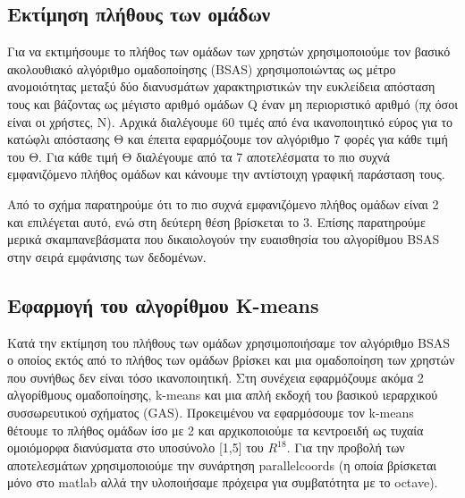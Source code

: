\subsection{Εκτίμηση πλήθους των ομάδων}
Για να εκτιμήσουμε το πλήθος των ομάδων των χρηστών χρησιμοποιούμε τον βασικό ακολουθιακό αλγόριθμο ομαδοποίησης (BSAS) χρησιμοποιώντας ως μέτρο ανομοιότητας μεταξύ δύο διανυσμάτων χαρακτηριστικών την ευκλείδεια απόσταση τους και βάζοντας ως μέγιστο αριθμό ομάδων Q έναν μη περιοριστικό αριθμό (πχ όσοι είναι οι χρήστες, Ν).
Αρχικά διαλέγουμε 60 τιμές από ένα ικανοποιητικό εύρος για το κατώφλι απόστασης Θ και έπειτα εφαρμόζουμε τον αλγόριθμο 7 φορές για κάθε τιμή του Θ.
Για κάθε τιμή Θ διαλέγουμε από τα 7 αποτελέσματα το πιο συχνά εμφανιζόμενο πλήθος ομάδων και κάνουμε την αντίστοιχη γραφική παράσταση τους.

\clearpage
\begin{figure}[ht]
\end{figure}

Από το σχήμα παρατηρούμε ότι το πιο συχνά εμφανιζόμενο πλήθος ομάδων είναι 2 και επιλέγεται αυτό, ενώ στη δεύτερη θέση βρίσκεται το 3.
Επίσης παρατηρούμε μερικά σκαμπανεβάσματα που δικαιολογούν την ευαισθησία του αλγορίθμου BSAS στην σειρά εμφάνισης των δεδομένων.

\subsection{Εφαρμογή του αλγορίθμου K-means}

Κατά την εκτίμηση του πλήθους των ομάδων χρησιμοποιήσαμε τον αλγόριθμο BSAS ο οποίος εκτός από το πλήθος των ομάδων βρίσκει και μια ομαδοποίηση των χρηστών που συνήθως δεν είναι τόσο ικανοποιητική.
Στη συνέχεια εφαρμόζουμε ακόμα 2 αλγορίθμους ομαδοποίησης, k-means  και μια απλή εκδοχή του βασικού ιεραρχικού συσσωρευτικού σχήματος (GAS).
Προκειμένου να εφαρμόσουμε τον k-means θέτουμε το πλήθος ομάδων ίσο με 2 και αρχικοποιούμε τα κεντροειδή ως τυχαία ομοιόμορφα διανύσματα στο υποσύνολο [1,5] του \(R^{18}\).
Για την προβολή των αποτελεσμάτων χρησιμοποιούμε την συνάρτηση parallelcoords (η οποία βρίσκεται μόνο στο matlab αλλά την υλοποιήσαμε πρόχειρα για συμβατότητα με το octave).

